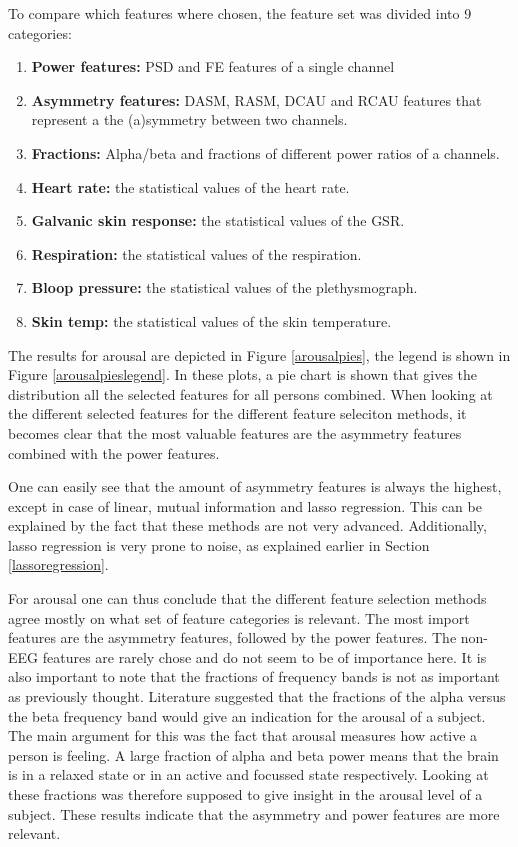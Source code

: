 To compare which features where chosen, the feature set was divided into 9 categories:
\begin{enumerate}
\item \textbf{Power features:} PSD and FE features of a single channel
\item \textbf{Asymmetry features:} DASM, RASM, DCAU and RCAU features that represent a the (a)symmetry between two channels.
\item \textbf{Fractions:} Alpha/beta and fractions of different power ratios of a channels.

\item \textbf{Heart rate:} the statistical values of the heart rate.
\item \textbf{Galvanic skin response:} the statistical values of the GSR.
\item \textbf{Respiration:} the statistical values of the respiration.
\item \textbf{Bloop pressure:} the statistical values of the plethysmograph.
\item \textbf{Skin temp:} the statistical values of the skin temperature.
\end{enumerate} 

The results for arousal are depicted in Figure \ref{arousalpies}, the legend is shown in Figure \ref{arousalpieslegend}. In these plots, a pie chart is shown that gives the distribution all the selected features for all persons combined. When looking at the different selected features for the different feature seleciton methods, it becomes clear that the most valuable features are the asymmetry features combined with the power features.

\npar

One can easily see that the amount of asymmetry features is always the highest, except in case of linear, mutual information and lasso regression. This can be explained by the fact that these methods are not very advanced. Additionally, lasso regression is very prone to noise, as explained earlier in Section \ref{lassoregression}. 

\npar

For arousal one can thus conclude that the different feature selection methods agree mostly on what set of feature categories is relevant. The most import features are the asymmetry features, followed by the power features. The non-EEG features are rarely chose and do not seem to be of importance here. It is also important to note that the fractions of frequency bands is not as important as previously thought. Literature suggested that the fractions of the alpha versus the beta frequency band would give an indication for the arousal of a subject. The main argument for this was the fact that arousal measures how active a person is feeling. A large fraction of alpha and beta power means that the brain is in a relaxed state or in an active and focussed state respectively. Looking at these fractions was therefore supposed to give insight in the arousal level of a subject. These results indicate that the asymmetry and power features are more relevant.

